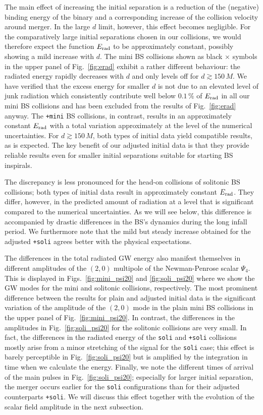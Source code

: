 \documentclass[]{iopart}
\begin{document}
The main effect of increasing the initial separation is a reduction
of the (negative) binding energy of the binary and a corresponding
increase of the collision velocity around merger. In the large $d$
limit, however, this effect becomes negligible. For the comparatively
large initial separations chosen in our collisions, we would therefore
expect the function $E_{\rm rad}$ to be approximately constant,
possibly showing a mild increase with $d$. The mini BS collisions
shown as black $\times$ symbols in the upper panel of Fig.~\ref{fig:erad}
exhibit a rather different behaviour: the radiated energy rapidly
decreases with $d$ and only levels off for $d\gtrsim 150\,M$. We
have verified that the excess energy for smaller $d$ is not due to
an elevated level of junk radiation which consistently contribute
well below $0.1\,\%$ of $E_{\rm rad}$ in all our mini BS collisions
and has been excluded from the results of Fig.~\ref{fig:erad} anyway.
The {\tt +mini} BS collisions, in contrast, results in an approximately
constant $E_{\rm rad}$ with a total variation approximately at the
level of the numerical uncertainties. For $d\gtrsim 150\,M$, both
types of initial data yield compatible results, as is expected.
The key benefit of our adjusted initial data is that they provide
reliable results even for smaller initial separations suitable for
starting BS inspirals.

The discrepancy is less pronounced for the head-on collisions of
solitonic BS collisions; both types of initial data result in
approximately constant $E_{\rm rad}$. They differ, however, in the
predicted amount of radiation at a level that is significant compared
to the numerical uncertainties. As we will see below, this difference
is accompanied by drastic differences in the BS's dynamics during
the long infall period. We furthermore note that the mild but steady
increase obtained for the adjusted {\tt +soli} agrees better with
the physical expectations.

The differences in the total radiated GW energy also manifest
themselves in different amplitudes of the $(2,0)$ multipole of the
Newman-Penrose scalar $\Psi_4$. This is displayed in
Figs.~\ref{fig:mini_psi20} and \ref{fig:soli_psi20} where we show
the GW modes for the mini and solitonic collisions, respectively.
The most prominent difference between the results for plain and
adjusted initial data is the significant variation of the amplitude
of the $(2,0)$ mode in the plain mini BS collisions in the upper
panel of Fig.~\ref{fig:mini_psi20}.  In contrast, the differences
in the amplitudes in Fig.~\ref{fig:soli_psi20} for the solitonic
collisions are very small. In fact, the differences in the radiated
energy of the {\tt soli} and {\tt +soli} collisions mostly arise
from a minor stretching of the signal for the {\tt soli} case; this
effect is barely perceptible in Fig.~\ref{fig:soli_psi20} but is
amplified by the integration in time when we calculate the energy.
Finally, we note the different times of arrival of the main pulses
in Fig.~\ref{fig:soli_psi20}; especially for larger initial separation,
the merger occurs earlier for the {\tt soli} configurations than
for their adjusted counterparts {\tt +soli}.  We will discuss this
effect together with the evolution of the scalar field amplitude
in the next subsection.
\end{document}
